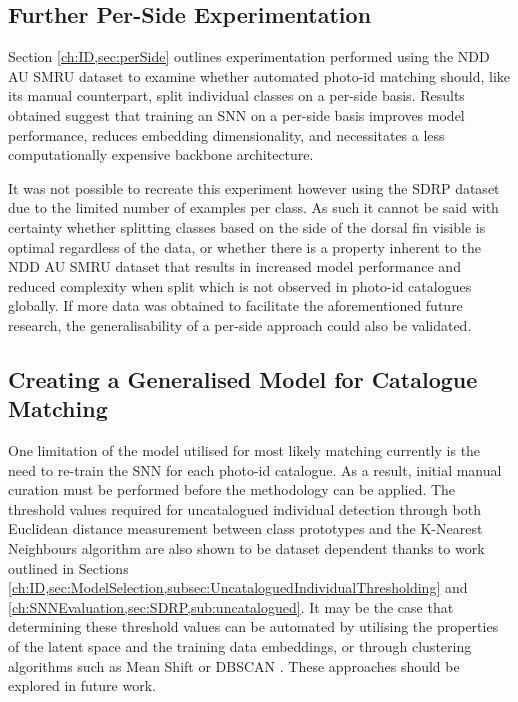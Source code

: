 \subsection{Further Per-Side Experimentation}\label{ch:Conclusion,sec:FutureWork,sub:MorePerSide}

Section \ref{ch:ID,sec:perSide} outlines experimentation performed using the NDD AU SMRU dataset to examine whether automated photo-id matching should, like its manual counterpart, split individual classes on a per-side basis. Results obtained suggest that training an SNN on a per-side basis improves model performance, reduces embedding dimensionality, and necessitates a less computationally expensive backbone architecture.

It was not possible to recreate this experiment however using the SDRP dataset due to the limited number of examples per class. As such it cannot be said with certainty whether splitting classes based on the side of the dorsal fin visible is optimal regardless of the data, or whether there is a property inherent to the NDD AU SMRU dataset that results in increased model performance and reduced complexity when split which is not observed in photo-id catalogues globally. If more data was obtained to facilitate the aforementioned future research, the generalisability of a per-side approach could also be validated.  

\subsection{Creating a Generalised Model for Catalogue Matching}\label{ch:Conclusion,sec:FutureWork,sub:GeneralSNN}

One limitation of the model utilised for most likely matching currently is the need to re-train the SNN for each photo-id catalogue. As a result, initial manual curation must be performed before the methodology can be applied. The threshold values required for uncatalogued individual detection through both Euclidean distance measurement between class prototypes and the K-Nearest Neighbours algorithm are also shown to be dataset dependent thanks to work outlined in Sections \ref{ch:ID,sec:ModelSelection,subsec:UncataloguedIndividualThresholding} and \ref{ch:SNNEvaluation,sec:SDRP,sub:uncatalogued}. It may be the case that determining these threshold values can be automated by utilising the properties of the latent space and the training data embeddings, or through clustering algorithms such as Mean Shift \cite{cheng_mean_1995} or DBSCAN \cite{ester_density-based_1996}. These approaches should be explored in future work.

